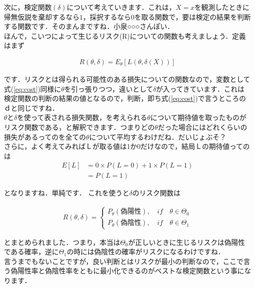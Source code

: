 \documentclass[11pt,a4paper,uplatex]{ujreport} 	%
\begin{document}
次に，検定関数$(\delta)$について考えていきます．これは，$X=x$を観測したときに帰無仮説を棄却するなら$1$，採択するなら$0$を取る関数で，要は検定の結果を判断する関数です．そのまんまですね．小泉○○○さんぽい．\\

ほんで，こいつによって生じるリスク(R)についての関数も考えましょう．定義はまず

\begin{align}
  R(\theta, \delta) = E_\theta[L(\theta, \delta(X))]
\end{align}

です．リスクとは得られる可能性のある損失についての関数なので，変数として式(\ref{eq:cost})同様に$\theta$を引っ張りつつ，違いとして$\delta$が入ってきています．これは検定関数の判断の結果の値となるので，判断，即ち式(\ref{eq:cost})で言うところのｄと同じですね．\\

$\theta$と$\delta$を使って表される損失関数，を考えられる$\theta$について期待値を取ったものがリスク関数である，と解釈できます．つまりどの$\theta$だった場合にはどれくらいの損失があるってのを全ての$\theta$について平均するわけだね．だいじょぶそ？\\

さらに，よく考えてみればＬが取る値は1か0だけなので，結局Ｌの期待値ってのは
\begin{align}
  E[L] &= 0 \times P(L=0) + 1 \times P(L=1)\\
       &= P(L=1)
\end{align}

となりますね．単純です．
これを使うと$\delta$のリスク関数は

\begin{align}
  R(\theta, \delta) = 
  \left\{
    \begin{array}{l}
    P_\theta(偽陽性), \quad if \quad \theta \in \Theta_0\\
    P_\theta(偽陰性), \quad if \quad \theta \in \Theta_1
    \end{array}
  \right.
  \label{eq:risk}
\end{align}

とまとめられました．つまり，本当は$\Theta_0$が正しいときに生じるリスクは偽陽性である確率，逆に$\Theta_1$の時には偽陰性の確率がリスクになるわけですね．\\

言うまでもないことですが，良い判断とはリスクが最小の判断なので，ここで言う偽陽性率と偽陰性率をともに最小化できるのがベストな検定関数という事になります．\\
\end{document}
